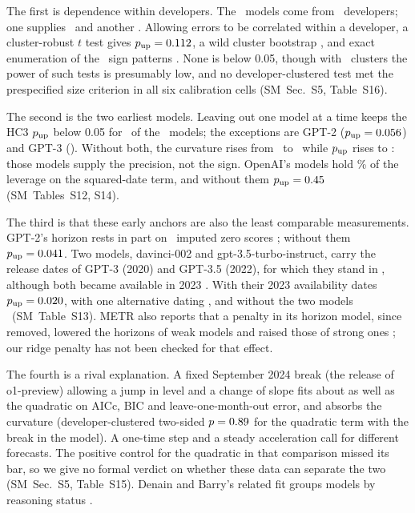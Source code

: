 \documentclass[aps,pre,twocolumn,superscriptaddress,nofootinbib,10pt]{revtex4-2}
\newcommand{\SM}{SM}
\begin{document}
The first is dependence within developers. The \nModels\ models come from \clG\ developers; one supplies \clMax\ and another \clSecond. Allowing errors to be correlated within a developer, a cluster-robust $t$ test \cite{bell2002,imbens2016} gives $p_{\rm up}=0.112$, a wild cluster bootstrap \cite{cameron2008,webb2023} \clWebb, and exact enumeration of the \clRadN\ sign patterns \clRad. None is below 0.05, though with \clG\ clusters the power of such tests is presumably low, and no developer-clustered test met the prespecified size criterion in all six calibration cells (\SM\ Sec.~S5, Table~S16).

The second is the two earliest models. Leaving out one model at a time keeps the HC3 $p_{\rm up}$ below 0.05 for \looNsig\ of the \nModels\ models; the exceptions are GPT-2 ($p_{\rm up}=0.056$) and GPT-3 (\looPGptThree). Without both, the curvature rises from \betaAll\ to \dropFirstTwoBeta\ while $p_{\rm up}$ rises to \dropFirstTwoP: those models supply the precision, not the sign. OpenAI's models hold \levOpenAI\% of the leverage on the squared-date term, and without them $p_{\rm up}=0.45$ (\SM\ Tables~S12, S14).

The third is that these early anchors are also the least comparable measurements. GPT-2's horizon rests in part on \impN\ imputed zero scores \cite{kwa2025}; without them $p_{\rm up}=0.041$. Two models, davinci-002 and gpt-3.5-turbo-instruct, carry the release dates of GPT-3 (2020) and GPT-3.5 (2022), for which they stand in \cite{kwa2025}, although both became available in 2023 \cite{metr2026risk}. With their 2023 availability dates $p_{\rm up}=0.020$, with one alternative dating \proxAvailPb, and without the two models \proxDropP\ (\SM\ Table~S13). METR also reports that a penalty in its horizon model, since removed, lowered the horizons of weak models and raised those of strong ones \cite{metr2026modelling}; our ridge penalty has not been checked for that effect.

The fourth is a rival explanation. A fixed September 2024 break (the release of o1-preview) allowing a jump in level and a change of slope fits about as well as the quadratic on AICc, BIC and leave-one-month-out error, and absorbs the curvature (developer-clustered two-sided $p=0.89$ for the quadratic term with the break in the model). A one-time step and a steady acceleration call for different forecasts. The positive control for the quadratic in that comparison missed its bar, so we give no formal verdict on whether these data can separate the two (\SM\ Sec.~S5, Table~S15). Denain and Barry's related fit groups models by reasoning status \cite{denain2026}.
\end{document}
